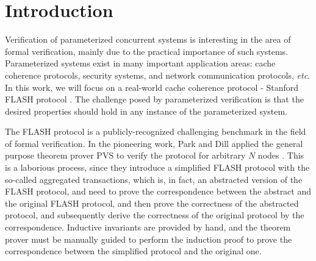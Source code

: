 \documentclass{llncs}
\newcommand\JP[1]{\textcolor{magenta}{JP: #1}}
\newcommand{\bedt}[1]{{\color{black}#1}}
\begin{document}
\section{Introduction}\label{sec:introduction}
Verification of parameterized concurrent systems is interesting in
the area of formal \bedt{verification}, mainly due to the practical importance
of such systems. Parameterized systems exist in many important
application areas: cache coherence protocols, security systems, and
network communication protocols, \emph{etc}. In this work, we will
focus on a real-world cache coherence protocol - Stanford FLASH protocol \cite{FLASHCache}. The challenge posed by
parameterized verification is that the desired properties should
hold in any instance of the parameterized system. %

The FLASH protocol is a publicly-recognized challenging benchmark in the field of formal
 verification. In the pioneering work,
Park and Dill applied the general purpose theorem prover PVS \cite{cade92-pvs}
to   verify the protocol for arbitrary $N$ nodes \cite{Park1996a}. This is a laborious process, since they introduce a simplified  FLASH protocol with the so-called aggregated transactions, which
is, in fact,  an abstracted version of the FLASH protocol, and  need to prove
the correspondence between the abstract and the original FLASH
protocol, and then prove the correctness of the abstracted protocol, and subsequently derive the correctness of  the
original protocol by the correspondence. %
Inductive invariants are provided by \bedt{hand}, and the theorem prover must be manually guided to perform the induction proof to prove the correspondence between the simplified protocol  and the original one. %
\end{document}
